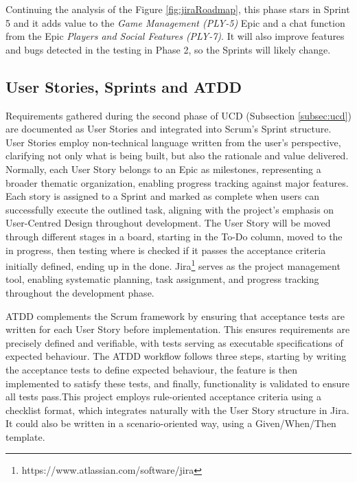 Continuing the analysis of the Figure \ref{fig:jiraRoadmap}, this phase stars in Sprint 5 and it adds value to the \textit{Game Management (PLY-5)} Epic and a chat function from the Epic \textit{Players and Social Features (PLY-7)}. It will also improve features and bugs detected in the testing in Phase 2, so the Sprints will likely change. 



\subsection{User Stories, Sprints and ATDD}\label{subsec:us-sprint-attd}

Requirements gathered during the second phase of UCD (Subsection \ref{subsec:ucd}) are documented as User Stories and integrated into Scrum's Sprint structure. User Stories employ non-technical language written from the user's perspective, clarifying not only what is being built, but also the rationale and value delivered\cite{userStoriesAtlassian}.  Normally, each User Story belongs to an Epic as milestones, representing a broader thematic organization, enabling progress tracking against major features.  Each story is assigned to a Sprint and marked as complete when users can successfully execute the outlined task, aligning with the project's emphasis on User-Centred Design throughout development. The User Story will be moved through different stages in a board, starting in the To-Do column, moved to the in progress, then testing where is checked if it passes the acceptance criteria initially defined, ending up in the done. Jira\footnote{https://www.atlassian.com/software/jira} serves as the project management tool, enabling systematic planning, task assignment, and progress tracking throughout the development phase. 

ATDD complements the Scrum framework by ensuring that acceptance tests are written for each User Story before implementation\cite{agileAllianceATDD}. This ensures requirements are precisely defined and verifiable, with tests serving as executable specifications of expected behaviour. The ATDD workflow follows three steps, starting by writing the acceptance tests to define expected behaviour, the feature is then implemented to satisfy these tests, and finally, functionality is validated to ensure all tests pass.This project employs rule-oriented acceptance criteria using a checklist format\cite{acceptanceCriteria}, which integrates naturally with the User Story structure in Jira. It could also be written in a scenario-oriented way, using a Given/When/Then template.

